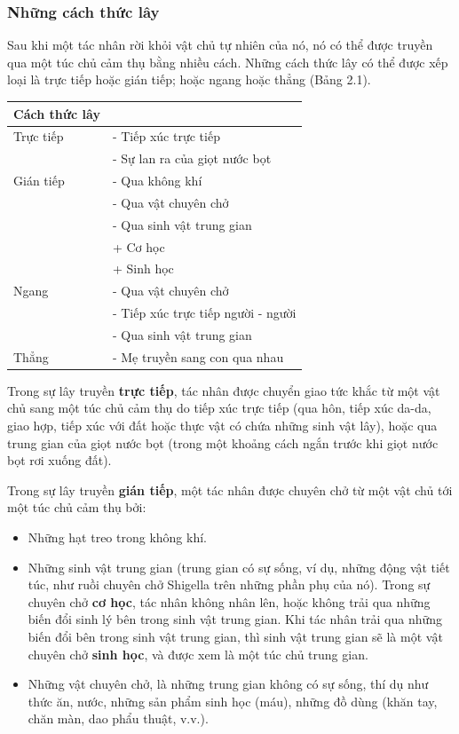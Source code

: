 \documentclass[
]{book}
\providecommand{\tightlist}{%
  \setlength{\itemsep}{0pt}\setlength{\parskip}{0pt}}
\begin{document}
\hypertarget{nhux1eefng-cuxe1ch-thux1ee9c-luxe2y}{%
\subsubsection{Những cách thức lây}\label{nhux1eefng-cuxe1ch-thux1ee9c-luxe2y}}

Sau khi một tác nhân rời khỏi vật chủ tự nhiên của nó, nó có thể được truyền qua một túc chủ cảm thụ bằng nhiều cách. Những cách thức lây có thể được xếp loại là trực tiếp hoặc gián tiếp; hoặc ngang hoặc thẳng (Bảng 2.1).

\begin{longtable}[]{@{}ll@{}}
\toprule
Cách thức lây & \\
\midrule
\endhead
Trực tiếp & - Tiếp xúc trực tiếp \\
~ & - Sự lan ra của giọt nước bọt \\
Gián tiếp & - Qua không khí \\
~ & - Qua vật chuyên chở \\
~ & - Qua sinh vật trung gian \\
~ & + Cơ học \\
~ & + Sinh học \\
Ngang & - Qua vật chuyên chở \\
~ & - Tiếp xúc trực tiếp người - người \\
~ & - Qua sinh vật trung gian \\
Thẳng & - Mẹ truyền sang con qua nhau \\
\bottomrule
\end{longtable}

Trong sự lây truyền \textbf{trực tiếp}, tác nhân được chuyển giao tức khắc từ một vật chủ sang một túc chủ cảm thụ do tiếp xúc trực tiếp (qua hôn, tiếp xúc da-da, giao hợp, tiếp xúc với đất hoặc thực vật có chứa những sinh vật lây), hoặc qua trung gian của giọt nước bọt (trong một khoảng cách ngắn trước khi giọt nước bọt rơi xuống đất).

Trong sự lây truyền \textbf{gián tiếp}, một tác nhân được chuyên chở từ một vật chủ tới một túc chủ cảm thụ bởi:

\begin{itemize}
\tightlist
\item
  Những hạt treo trong không khí.
\item
  Những sinh vật trung gian (trung gian có sự sống, ví dụ, những động vật tiết túc, như ruồi chuyên chở Shigella trên những phần phụ của nó). Trong sự chuyên chở \textbf{cơ học}, tác nhân không nhân lên, hoặc không trải qua những biến đổi sinh lý bên trong sinh vật trung gian. Khi tác nhân trải qua những biến đổi bên trong sinh vật trung gian, thì sinh vật trung gian sẽ là một vật chuyên chở \textbf{sinh học}, và được xem là một túc chủ trung gian.
\item
  Những vật chuyên chở, là những trung gian không có sự sống, thí dụ như thức ăn, nước, những sản phẩm sinh học (máu), những đồ dùng (khăn tay, chăn màn, dao phẩu thuật, v.v.).
\end{itemize}
\end{document}
